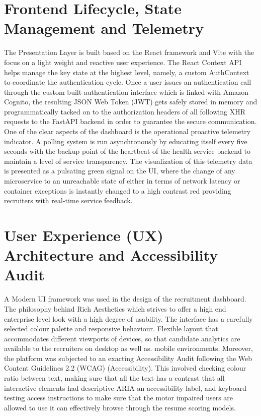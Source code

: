 \documentclass[conference]{IEEEtran}
\begin{document}
\section{Frontend Lifecycle, State Management and Telemetry}
The Presentation Layer is built based on the React framework and Vite with the focus on a light weight and reactive user experience. The React Context API helps manage the key state at the highest level, namely, a custom AuthContext to coordinate the authentication cycle. Once a user issues an authentication call through the custom built authentication interface which is linked with Amazon Cognito, the resulting JSON Web Token (JWT) gets safely stored in memory and programmatically tacked on to the authorization headers of all following XHR requests to the FastAPI backend in order to guarantee the secure communication. One of the clear aspects of the dashboard is the operational proactive telemetry indicator. A polling system is run asynchronously by educating itself every five seconds with the backup point of the heartbeat of the health service backend to maintain a level of service transparency. The visualization of this telemetry data is presented as a pulsating green signal on the UI, where the change of any microservice to an unreachable state of either in terms of network latency or container exceptions is instantly changed to a high contrast red providing recruiters with real-time service feedback.

\section{User Experience (UX) Architecture and Accessibility Audit}
A Modern UI framework was used in the design of the recruitment dashboard. The philosophy behind Rich Aesthetics which strives to offer a high end enterprise level look with a high degree of usability. The interface has a carefully selected colour palette and responsive behaviour. Flexible layout that accommodates different viewports of devices, so that candidate analytics are available to the recruiters on desktop as well as. mobile environments. Moreover, the platform was subjected to an exacting Accessibility Audit following the Web Content Guidelines 2.2 (WCAG) (Accessibility). This involved checking colour ratio between text, making sure that all the text has a contrast that all interactive elements had descriptive ARIA an accessibility label, and keyboard testing access instructions to make sure that the motor impaired users are allowed to use it can effectively browse through the resume scoring models.
\end{document}
